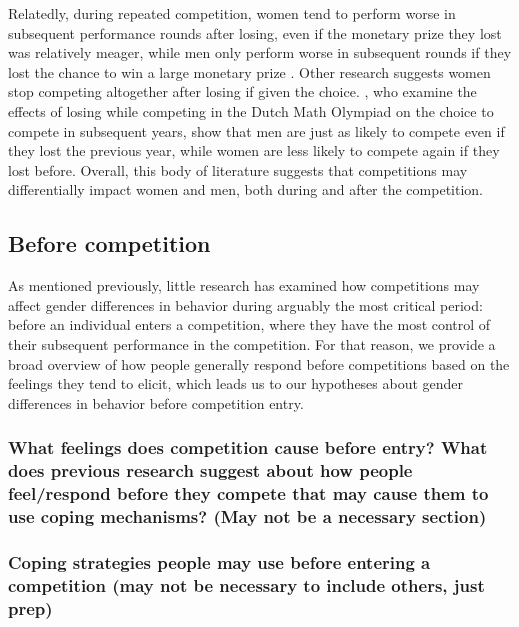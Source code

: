 \documentclass[a4paper, nobind]{templates/ociamthesis}
\begin{document}
Relatedly, during repeated competition, women tend to perform worse in subsequent performance rounds after losing, even if the monetary prize they lost was relatively meager, while men only perform worse in subsequent rounds if they lost the chance to win a large monetary prize \autocite{Gill2014}. Other research suggests women stop competing altogether after losing if given the choice. \textcite{Buser2019}, who examine the effects of losing while competing in the Dutch Math Olympiad on the choice to compete in subsequent years, show that men are just as likely to compete even if they lost the previous year, while women are less likely to compete again if they lost before. Overall, this body of literature suggests that competitions may differentially impact women and men, both during and after the competition.

\hypertarget{before-competition}{%
\subsection{Before competition}\label{before-competition}}

As mentioned previously, little research has examined how competitions may affect gender differences in behavior during arguably the most critical period: before an individual enters a competition, where they have the most control of their subsequent performance in the competition. For that reason, we provide a broad overview of how people generally respond before competitions based on the feelings they tend to elicit, which leads us to our hypotheses about gender differences in behavior before competition entry.

\hypertarget{what-feelings-does-competition-cause-before-entry-what-does-previous-research-suggest-about-how-people-feelrespond-before-they-compete-that-may-cause-them-to-use-coping-mechanisms-may-not-be-a-necessary-section}{%
\subsubsection{What feelings does competition cause before entry? What does previous research suggest about how people feel/respond before they compete that may cause them to use coping mechanisms? (May not be a necessary section)}\label{what-feelings-does-competition-cause-before-entry-what-does-previous-research-suggest-about-how-people-feelrespond-before-they-compete-that-may-cause-them-to-use-coping-mechanisms-may-not-be-a-necessary-section}}

\hypertarget{coping-strategies-people-may-use-before-entering-a-competition-may-not-be-necessary-to-include-others-just-prep}{%
\subsubsection{Coping strategies people may use before entering a competition (may not be necessary to include others, just prep)}\label{coping-strategies-people-may-use-before-entering-a-competition-may-not-be-necessary-to-include-others-just-prep}}
\end{document}
